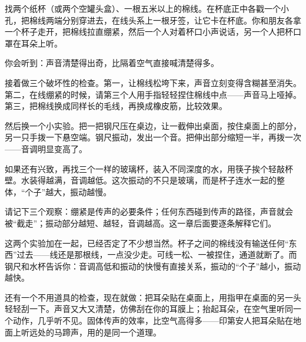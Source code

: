 \begin{experiment}[棉线电话和桌边的尺子]
找两个纸杯（或两个空罐头盒）、一根五米以上的棉线。在杯底正中各戳一个小孔，把棉线两端分别穿进去，在线头系上一根牙签，让它卡在杯底。你和朋友各拿一个杯子走开，把棉线拉直绷紧，然后一个人对着杯口小声说话，另一个人把杯口罩在耳朵上听。

你会听到：声音清楚得出奇，比隔着空气直接喊清楚得多。

接着做三个破坏性的检查。第一，让棉线松垮下来，声音立刻变得含糊甚至消失。第二，在线绷紧的时候，请第三个人用手指轻轻捏住棉线中点——声音马上哑掉。第三，把棉线换成同样长的毛线，再换成橡皮筋，比较效果。

然后换一个小实验。把一把钢尺压在桌边，让一截伸出桌面，按住桌面上的部分，另一只手拨一下悬空端。钢尺振动，发出一个音。把伸出部分缩短一半，再拨一次——音调明显变高了。

如果还有兴致，再找三个一样的玻璃杯，装入不同深度的水，用筷子挨个轻敲杯壁。水装得越满，音调越低。这次振动的不只是玻璃，而是杯子连水一起的整体，“个子”越大，振动越慢。

请记下三个观察：绷紧是传声的必要条件；任何东西碰到传声的路径，声音就会被“截走”；振动部分越短、越轻，音调越高。这一章后面要逐条解释它们。
\end{experiment}

\begin{mainline}
这两个实验加在一起，已经否定了不少想当然。杯子之间的棉线没有输送任何“东西”过去——线还是那根线，一点没少走。可线一松、一被捏住，通道就断了。而钢尺和水杯告诉你：音调高低和振动的快慢有直接关系，振动的“个子”越小，振动越快。

还有一个不用道具的检查，现在就做：把耳朵贴在桌面上，用指甲在桌面的另一头轻轻刮一下。声音又大又清楚，仿佛刮在你的耳膜上；抬起耳朵，在空气里听同一个动作，几乎听不见。固体传声的效率，比空气高得多——印第安人把耳朵贴在地面上听远处的马蹄声，用的是同一个道理。
\end{mainline}


